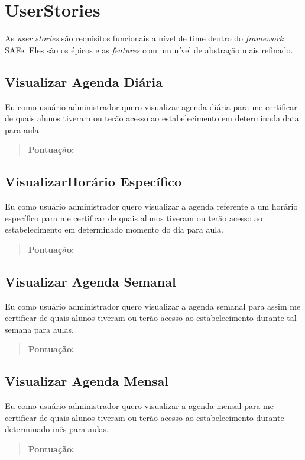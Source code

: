 \section[UserStories]{UserStories}
As \textsl{user stories} são requisitos funcionais a nível de time dentro do
\textsl{framework} SAFe. Eles são os épicos e as \textsl{features} com um nível
de abstração mais refinado.

\subsection[Visualizar Agenda Diária]{Visualizar Agenda Diária}
Eu como usuário administrador quero visualizar agenda diária para
me certificar de quais alunos tiveram ou terão acesso ao estabelecimento
em determinada data para aula.
\begin{quote}
    \textbf{Pontuação:}
\end{quote}

\subsection[Visualizar Horário Específico]{VisualizarHorário Específico}
Eu como usuário administrador quero visualizar a agenda referente a um horário
específico para me certificar de quais alunos tiveram ou terão acesso ao
estabelecimento em determinado momento do dia para aula.
\begin{quote}
    \textbf{Pontuação:}
\end{quote}

\subsection[Visualizar Agenda Semanal]{Visualizar Agenda Semanal}
Eu como usuário administrador quero visualizar a agenda semanal para assim me
certificar de quais alunos tiveram ou terão acesso ao estabelecimento durante tal
semana para aulas.
\begin{quote}
    \textbf{Pontuação:}
\end{quote}

\subsection[Visualizar Agenda Mensal]{Visualizar Agenda Mensal}
Eu como usuário administrador quero visualizar a agenda mensal para me
certificar de quais alunos tiveram ou terão acesso ao estabelecimento durante
determinado mês para aulas.
\begin{quote}
    \textbf{Pontuação:}
\end{quote}

